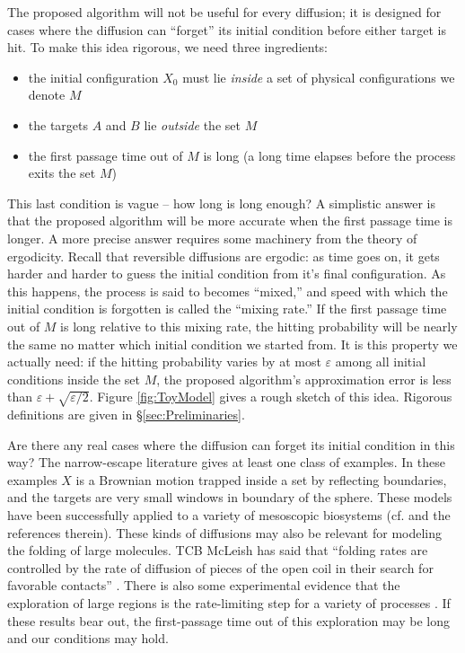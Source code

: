 \documentclass[12pt, nofootinbib,english, amsmath, amssymb, aps, priprint, graphicx,floatfix,draft]{revtex4-1}
\theoremstyle{plain}
\theoremstyle{definition}
\theoremstyle{plain}
\begin{document}
The proposed algorithm will not be useful for every diffusion; it is designed for cases where the diffusion can ``forget'' its initial condition before either target is hit.  To make this idea rigorous, we need three ingredients:
\begin{itemize}
    \item the initial configuration $X_0$ must lie \emph{inside} a set of physical configurations we denote $M$
    \item the targets $A$ and $B$ lie \emph{outside} the set $M$
    \item the first passage time out of $M$ is long (a long time elapses before the process exits the set $M$)
\end{itemize}
This last condition is vague -- how long is long enough?  A simplistic answer is that the proposed algorithm will be more accurate when the first passage time is longer.  A more precise answer requires some machinery from the theory of ergodicity.  Recall that reversible diffusions are ergodic: as time goes on, it gets harder and harder to guess the initial condition from it's final configuration.  As this happens, the process is said to becomes ``mixed,'' and speed with which the initial condition is forgotten is called the ``mixing rate.''  If the first passage time out of $M$ is long relative to this mixing rate, the hitting probability will be nearly the same no matter which initial condition we started from.  It is this property we actually need: if the hitting probability varies by at most $\varepsilon$ among all initial conditions inside the set $M$, the proposed algorithm's approximation error is less than $\varepsilon + \sqrt{\varepsilon/2}$.  Figure \ref{fig:ToyModel} gives a rough sketch of this idea.  Rigorous definitions are given in  \S\ref{sec:Preliminaries}.  

Are there any real cases where the diffusion can forget its initial condition in this way?  The narrow-escape literature gives at least one class of examples.  In these examples $X$ is a Brownian motion trapped inside a set by reflecting boundaries, and the targets are very small windows in boundary of the sphere.  These models have been successfully applied to a variety of mesoscopic biosystems (cf. \cite{schuss2007narrow} and the references therein).  These kinds of diffusions may also be relevant for modeling the folding of large molecules.  TCB McLeish has said that ``folding rates are controlled by the rate of diffusion of pieces of the open coil in their search for favorable contacts'' \cite{McLeish2005-dq}.  There is also some experimental evidence that the exploration of large regions is the rate-limiting step for a variety of processes \cite{Goldberg1999-mv,Jacob1999-bs,Plaxco1998-iv,Wales2006-ur}.  If these results bear out, the first-passage time out of this exploration may be long and our conditions may hold. 
\end{document}
